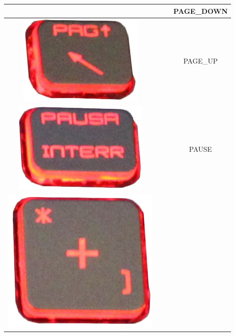 \begin{longtable}{cccc}
\begin{minipage}[c]{.3\textwidth}
\vspace{0.2cm}
\end{minipage} & & & PAGE\_DOWN\\
\hline
\begin{minipage}[c]{.3\textwidth}
\vspace{0.2cm}
\includegraphics[scale=0.1]{Images/KeyMapping/PAGE_UP}
\vspace{0.2cm}
\end{minipage} & & & PAGE\_UP\\
\hline
\begin{minipage}[c]{.3\textwidth}
\vspace{0.2cm}
\includegraphics[scale=0.1]{Images/KeyMapping/PAUSE}
\vspace{0.2cm}
\end{minipage} & & & PAUSE\\
\hline
\begin{minipage}[c]{.3\textwidth}
\vspace{0.2cm}
\includegraphics[scale=0.1]{Images/KeyMapping/PLUS}

\end{minipage}
\end{longtable}
